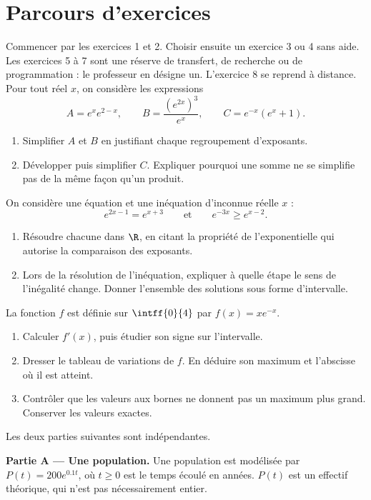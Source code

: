 \section*{Parcours d’exercices}\label{C09-PARC}
Commencer par les exercices 1 et 2. Choisir ensuite un exercice 3 ou 4 sans aide. Les exercices 5 à 7 sont une réserve de transfert, de recherche ou de programmation : le professeur en désigne un. L’exercice 8 se reprend à distance.
\begingroup
{}
Pour tout réel $x$, on considère les expressions\[A=e^xe^{2-x},\qquad B=\dfrac{(e^{2x})^3}{e^x},\qquad C=e^{-x}(e^x+1).\]
\begin{enumerate}[label=\arabic*.]
\item Simplifier $A$ et $B$ en justifiant chaque regroupement d’exposants.
\item Développer puis simplifier $C$. Expliquer pourquoi une somme ne se simplifie pas de la même façon qu’un produit.
\end{enumerate}
On considère une équation et une inéquation d’inconnue réelle $x$ :\[e^{2x-1}=e^{x+3}\qquad\text{et}\qquad e^{-3x}\geq e^{x-2}.\]
\begin{enumerate}[label=\arabic*.]
\item Résoudre chacune dans $\R$, en citant la propriété de l’exponentielle qui autorise la comparaison des exposants.
\item Lors de la résolution de l’inéquation, expliquer à quelle étape le sens de l’inégalité change. Donner l’ensemble des solutions sous forme d’intervalle.
\end{enumerate}
La fonction $f$ est définie sur $\intff{0}{4}$ par $f(x)=xe^{-x}$.
\begin{enumerate}[label=\arabic*.]
\item Calculer $f\prime(x)$, puis étudier son signe sur l’intervalle.
\item Dresser le tableau de variations de $f$. En déduire son maximum et l’abscisse où il est atteint.
\item Contrôler que les valeurs aux bornes ne donnent pas un maximum plus grand. Conserver les valeurs exactes.
\end{enumerate}
Les deux parties suivantes sont indépendantes.\par\textbf{Partie A — Une population.} Une population est modélisée par $P(t)=200e^{\num{0,1}t}$, où $t\geq0$ est le temps écoulé en années. $P(t)$ est un effectif théorique, qui n’est pas nécessairement entier.
